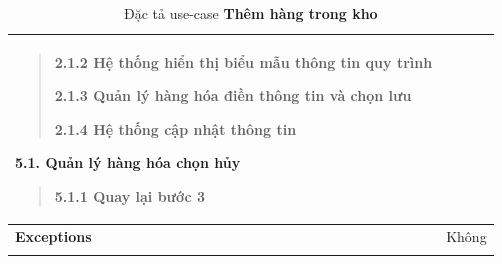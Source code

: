 {\begin{longtable}{| p{} | p{} |}
\begin{quote}
                        2.1.2 Hệ thống hiển thị biểu mẫu thông tin quy trình
                        
                        2.1.3 Quản lý hàng hóa điền thông tin và chọn lưu
                        
                        2.1.4 Hệ thống cập nhật thông tin
                    \end{quote}
                5.1. Quản lý hàng hóa chọn hủy
                    \begin{quote} 
                    5.1.1 Quay lại bước 3
                    \end{quote}
                \\
                \hline
                    \textbf{Exceptions} 
                &
                    Không
                \\
                \hline
                \caption{Đặc tả use-case \textbf{Thêm hàng trong kho}}
            \end{longtable}
        }

